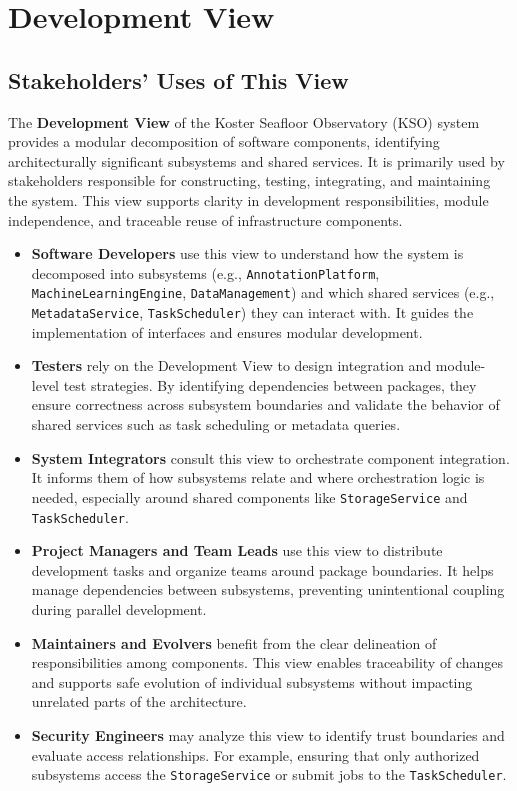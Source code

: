 \section{Development View} 

\subsection{Stakeholders’ Uses of This View}

The \textbf{Development View} of the Koster Seafloor Observatory (KSO) system provides a modular decomposition of software components, identifying architecturally significant subsystems and shared services. It is primarily used by stakeholders responsible for constructing, testing, integrating, and maintaining the system. This view supports clarity in development responsibilities, module independence, and traceable reuse of infrastructure components.

\begin{itemize}
  \item \textbf{Software Developers} use this view to understand how the system is decomposed into subsystems (e.g., \texttt{AnnotationPlatform}, \texttt{MachineLearningEngine}, \texttt{DataManagement}) and which shared services (e.g., \texttt{MetadataService}, \texttt{TaskScheduler}) they can interact with. It guides the implementation of interfaces and ensures modular development.

  \item \textbf{Testers} rely on the Development View to design integration and module-level test strategies. By identifying dependencies between packages, they ensure correctness across subsystem boundaries and validate the behavior of shared services such as task scheduling or metadata queries.

  \item \textbf{System Integrators} consult this view to orchestrate component integration. It informs them of how subsystems relate and where orchestration logic is needed, especially around shared components like \texttt{StorageService} and \texttt{TaskScheduler}.

  \item \textbf{Project Managers and Team Leads} use this view to distribute development tasks and organize teams around package boundaries. It helps manage dependencies between subsystems, preventing unintentional coupling during parallel development.

  \item \textbf{Maintainers and Evolvers} benefit from the clear delineation of responsibilities among components. This view enables traceability of changes and supports safe evolution of individual subsystems without impacting unrelated parts of the architecture.

  \item \textbf{Security Engineers} may analyze this view to identify trust boundaries and evaluate access relationships. For example, ensuring that only authorized subsystems access the \texttt{StorageService} or submit jobs to the \texttt{TaskScheduler}.
\end{itemize}

